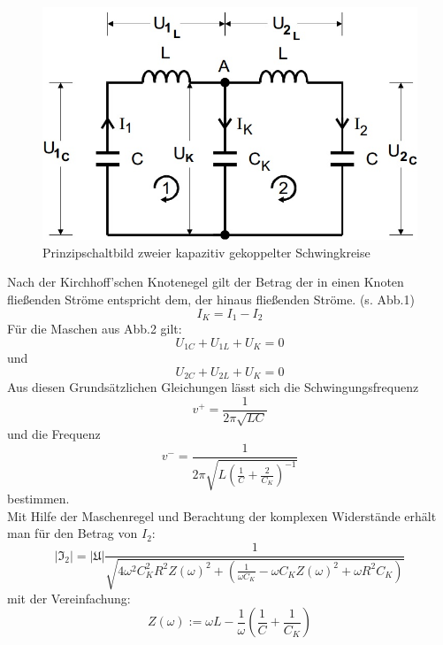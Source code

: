 \begin{figure}[h]
        \centering
        \includegraphics[scale=0.5]{Grafiken/V355Abb1.jpg}
        \caption{Prinzipschaltbild zweier kapazitiv gekoppelter Schwingkreise}
        \label{fig:Abb1}
\end{figure}
Nach der Kirchhoff'schen Knotenegel gilt der Betrag der in einen Knoten fließenden Ströme entspricht dem, der hinaus fließenden Ströme. (s. Abb.1)
\begin{equation}
I_K = I_1 - I_2
\end{equation}
Für die Maschen aus Abb.2 gilt:
\begin{equation}
U_{1C} + U_{1L} + U_K = 0
\end{equation}
und
\begin{equation}
U_{2C} + U_{2L} + U_K = 0
\end{equation}
Aus diesen Grundsätzlichen Gleichungen lässt sich die Schwingungsfrequenz
\begin{equation}
v^+ = \frac{1}{2 \pi \sqrt{L C}}
\label{eq:f+}
\end{equation}
und die Frequenz
\begin{equation}
v^- = \frac{1}{2 \pi \sqrt{L\left(\frac{1}{C} + \frac{2}{C_K}\right)^{-1}}}
\label{eq:f-}
\end{equation}
bestimmen. \\
Mit Hilfe der Maschenregel und Berachtung der komplexen Widerstände erhält man für den Betrag von $I_2$:
\begin{equation}
|\mathfrak{I}_2| = |\mathfrak{U}| \frac{1}{\sqrt{4 \omega^2 C_K^2 R^2 Z(\omega )^2 + \left(\frac{1}{\omega C_K} - \omega C_K Z(\omega )^2 + \omega R^2 C_K\right)}}
\label{eq:I2}
\end{equation}
mit der Vereinfachung:
\begin{equation*}
Z(\omega ) := \omega L - \frac{1}{\omega } \left(\frac{1}{C} + \frac{1}{C_K}\right) 
\end{equation*}
